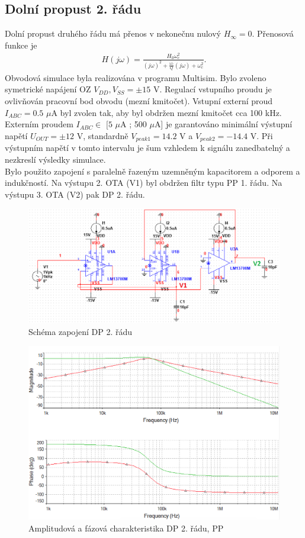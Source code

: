 \subsection{Dolní propust 2. řádu}\label{s:DP2}
Dolní propust druhého řádu má přenos v nekonečnu nulový $H_{\infty} = 0$. Přenosová funkce je
\begin{align}
H(j\omega) = \frac{H_0 \omega_c ^2}{(j\omega)^2 + \frac{\omega _c}{Q}(j\omega) + \omega _c ^2}.
\end{align}
\noindent Obvodová simulace byla realizována v programu Multisim. Bylo zvoleno symetrické napájení OZ $V_{DD},V_{SS} = \pm 15$ V. Regulací vstupního proudu je ovlivňován pracovní bod obvodu (mezní kmitočet). Vstupní externí proud $I_{ABC} = 0.5$ $\mu$A byl zvolen tak, aby byl obdržen mezní kmitočet cca 100 kHz. Externím proudem $I_{ABC} \in$ $[5$ $\mu$A ; 500 $\mu$A] je garantováno minimální výstupní napětí $U_{OUT} = \pm 12$ V, standardně $V_{peak 1} = 14.2$ V a $V_{peak 2} = -14.4$ V. Při výstupním napětí v tomto intervalu je šum vzhledem k signálu zanedbatelný a nezkreslí výsledky simulace.\\
\noindent Bylo použito zapojení s paralelně řazeným uzemněným kapacitorem a odporem a indukčností. Na výstupu 2. OTA (V1) byl obdržen filtr typu PP 1. řádu. Na výstupu 3. OTA (V2) pak DP 2. řádu.
\begin{figure}[H]
\centering
\includegraphics[scale=0.3]{bplp.png}
\caption{Schéma zapojení DP 2. řádu}
\end{figure}\begin{figure}[H]
\centering
\includegraphics[scale=0.5]{bplp2.png}
\caption{Amplitudová a fázová charakteristika DP 2. řádu, PP}
\end{figure}

